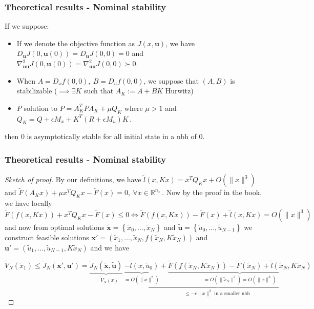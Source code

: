\documentclass[10pt]{beamer}
\def\bb#1{\mathbb{#1}}
\def\bf#1{\mathbf{#1}}
\begin{document}
\begin{frame}
    \frametitle{Theoretical results - Nominal stability}
    \begin{theorem}
        If we suppose:
        \begin{itemize}[label=\textbullet]
            \item If we denote the objective function as $J(x,\bf{u})$, we have $D_\bf{u}J(0,\bf{u}(0))=D_\bf{u}J(0,0)=0$ and $\nabla^2_{\bf{u}\bf{u}}J(0,\bf{u}(0))=\nabla^2_{\bf{u}\bf{u}}J(0,0)\succ 0$.

            \item When $A=D_xf(0,0),~B=D_uf(0,0)$, we suppose that $(A,B)$ is stabilizable ($\implies \exists K$ such that $A_K:=A+BK$ Hurwitz)
            
            \item $P$ solution to $P=A_K^TPA_K+\mu Q_K$ where $\mu>1$ and $Q_K=Q+\epsilon M_x+K^T(R+\epsilon M_u)K$\,.
        \end{itemize}
        then 0 is asymptotically stable for all initial state in a nbh of 0.
    \end{theorem}
\end{frame}

\begin{frame}
    \frametitle{Theoretical results - Nominal stability}
    \begin{proof}[Sketch of proof]
        
        By our definitions, we have $\tilde{l}(x,Kx)=x^TQ_Kx+O(\|x\|^3)$ and $\tilde{F}(A_Kx)+\mu x^T Q_K x-\tilde{F}(x)=0,~\forall x\in\bb{R}^{n_x}$\,.
        Now by the proof in the book, we have locally 
        $$\tilde{F}(f(x,Kx))+x^T Q_K x-\tilde{F}(x)\leq 0
		\Longleftrightarrow\tilde{F}(f(x,Kx))-\tilde{F}(x)+\tilde{l}(x,Kx) = O(\|x\|^3)$$
        and now from optimal solutions $\tilde{\bf{x}}=\left\{ \tilde{x}_0,\dots,\tilde{x}_N \right\}$ and $\tilde{\bf{u}}=\left\{ \tilde{u}_0,\dots,\tilde{u}_{N-1} \right\}$ we construct feasible solutions $\bf{x}'=(\tilde{x}_1,\dots,\tilde{x}_N,f(\tilde{x}_N,K\tilde{x}_N))$ and $\bf{u}'=(\tilde{u}_1,\dots,\tilde{u}_{N-1},K\tilde{x}_N)$ and we have
        
        $$\tilde{V}_N(\tilde{x}_1)\leq\tilde{J}_N(\bf{x}',\bf{u}')=\underbrace{\tilde{J}_N(\tilde{\bf{x}},\tilde{\bf{u}})}_{=\tilde{V}_N(x)}~\underbrace{\underbrace{-\tilde{l}(x,\tilde{u}_0)}_{=O(\|x\|^2)}+\underbrace{\tilde{F}(f(\tilde{x}_N,K\tilde{x}_N))-\tilde{F}(\tilde{x}_N)+\tilde{l}(\tilde{x}_N,K\tilde{x}_N) }_{=O(\|\tilde{x}_N\|^3)=O(\|x\|^3)} }_{\leq-c\|x\|^2\text{ in a smaller nbh }}$$
    \end{proof}
\end{frame}
\end{document}
